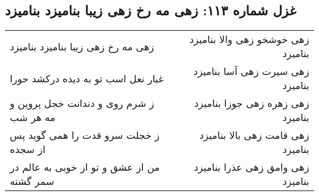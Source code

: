 \begin{center}
\section*{غزل شماره ۱۱۳: زهی مه رخ زهی زیبا بنامیزد بنامیزد}
\label{sec:113}
\begin{longtable}{l p{0.5cm} r}
زهی مه رخ زهی زیبا بنامیزد بنامیزد
&&
زهی خوشخو زهی والا بنامیزد بنامیزد
\\
غبار نعل اسب تو به دیده درکشد حورا
&&
زهی سیرت زهی آسا بنامیزد بنامیزد
\\
ز شرم روی و دندانت خجل پروین و مه هر شب
&&
زهی زهره زهی جوزا بنامیزد بنامیزد
\\
ز خجلت سرو قدت را همی گوید پس از سجده
&&
زهی قامت زهی بالا بنامیزد بنامیزد
\\
من از عشق و تو از خوبی به عالم در سمر گشته
&&
زهی وامق زهی عذرا بنامیزد بنامیزد
\\
\end{longtable}
\end{center}
